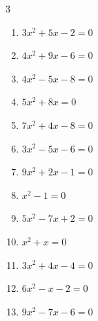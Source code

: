 \begin{multicols}{3}
\begin{enumerate}
\columnbreak %

\resetques

  \item $3x^{2}+5x-2=0$


  \item $4x^{2}+9x-6=0$


  \item $4x^{2}-5x-8=0$


  \item $5x^{2}+8x=0$


  \item $7x^{2}+4x-8=0$


  \item $3x^{2}-5x-6=0$


  \item $9x^{2}+2x-1=0$


\columnbreak %

  \item $x^{2}-1=0$

        \phantom{$\displaystyle x=\pm 1$}

  \item $5x^{2}-7x+2=0$


  \item $x^{2}+x=0$

        \phantom{$\displaystyle x=0, \; -1$}

  \item $3x^{2}+4x-4=0$


  \item $6x^{2}-x-2=0$


  \item $9x^{2}-7x-6=0$


\end{enumerate}
\end{multicols}
